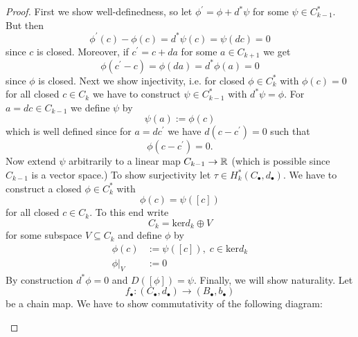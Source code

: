         \begin{proof}
            First we show well-definedness, so let $\phi^\prime = \phi + d^\ast\psi$ for some $\psi \in C_{k-1}^\ast$. But then
            \[
            \phi^\prime(c) - \phi(c) = d^\ast\psi(c) = \psi(dc) = 0
            \]
            since $c$ is closed. Moreover, if $c^\prime = c + da$ for some $a\in C_{k+1}$ we get
            \[
            \phi(c^\prime-c) = \phi(da) = d^\ast\phi(a) = 0
            \]
            since $\phi$ is closed. Next we show injectivity, i.e. for closed $\phi \in C_k^\ast$ with $\phi(c) = 0$ for all closed $c \in C_k$ we have to construct $\psi \in C_{k-1}^\ast$ with $d^\ast \psi = \phi$. For $a = dc \in C_{k-1}$ we define $\psi$ by 
            \[
            \psi(a) := \phi(c)
            \]
            which is well defined since for $a = dc^\prime$ we have $d(c-c^\prime) = 0$ such that
            \[
            \phi(c-c^\prime) = 0.
            \]
            Now extend $\psi$ arbitrarily to a linear map $C_{k-1} \to \mathbb{R}$ (which is possible since $C_{k-1}$ is a vector space.)
            To show surjectivity let $\tau \in H_k^\ast(C_\bullet,d_\bullet)$. We have to construct a closed $\phi \in C_k^\ast$ with 
            \[
            \phi(c) = \psi([c])
            \]
            for all closed $c \in C_k$. To this end write
            \[
            C_k = \mathrm{ker}d_k \oplus V
            \]
            for some subspace $V \subseteq C_k$ and define $\phi$ by
            \begin{align*}
                \phi(c) &:= \psi([c]), \; c \in \mathrm{ker}d_k \\
                \phi|_V &:= 0
            \end{align*}
            By construction $d^\ast\phi = 0$ and $D([\phi]) = \psi$. Finally, we will show naturality. Let 
            \[
            f_\bullet \colon (C_\bullet,d_\bullet) \to (B_\bullet,b_\bullet)
            \]
            be a chain map. We have to show commutativity of the following diagram:
            \begin{center}
\end{center}
\end{proof}
